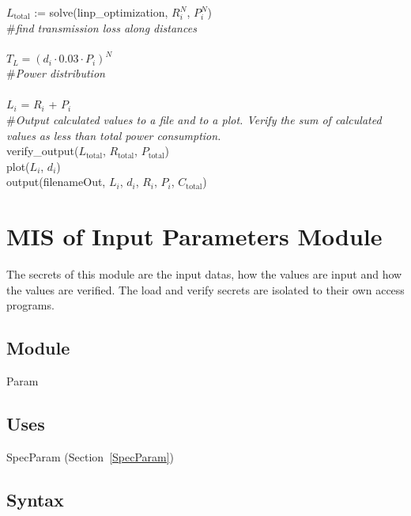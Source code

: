 \documentclass[12pt, titlepage]{article}
\begin{document}
\noindent $L_\text{total}$ := solve(linp\_optimization,
$R_i^N$, $P_i^N$)\\


\noindent \#\textit{find transmission loss along distances}\\
\\
\indent $T_L = (d_i \cdot 0.03 \cdot P_i)^{N}$\\

\noindent \#\textit{Power distribution}\\
\\
\indent $L_i$ = $R_i$ + $P_i$ \\

\noindent \#\textit{Output calculated values to a file and to a plot.  Verify
 the sum of calculated values as less than total power consumption.}\\

\noindent verify\_output($L_\text{total}$, $R_\text{total}$, $P_\text{total}$)\\

\noindent plot($L_i$, $d_i$)\\

\noindent output(filenameOut, $L_i$, $d_i$, $R_i$, $P_i$, $C_\text{total}$)\\

\newpage

\section{MIS of Input Parameters Module} \label{Parameters}

The secrets of this module are the input datas, how the
values are input and how the values are verified.  The load and verify secrets
are isolated to their own access programs.

\subsection{Module}

Param

\subsection{Uses}

SpecParam (Section~\ref{SpecParam})

\subsection{Syntax}
\end{document}
